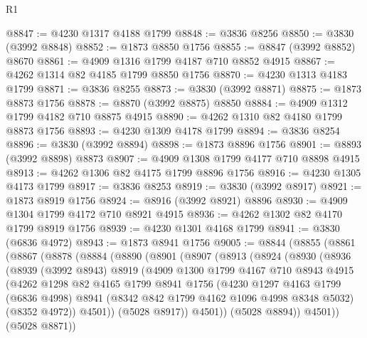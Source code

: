 \begin{lexlean}{R1}
\begin{coremodule}
@8847 := @4230 @1317 @4188 @1799
@8848 := @3836 @8256
@8850 := @3830 (@3992 @8848)
@8852 := @1873 @8850 @1756
@8855 := @8847 (@3992 @8852) @8670
@8861 := @4909 @1316 @1799 @4187 @710 @8852 @4915
@8867 := @4262 @1314 @82 @4185 @1799 @8850 @1756
@8870 := @4230 @1313 @4183 @1799
@8871 := @3836 @8255
@8873 := @3830 (@3992 @8871)
@8875 := @1873 @8873 @1756
@8878 := @8870 (@3992 @8875) @8850
@8884 := @4909 @1312 @1799 @4182 @710 @8875 @4915
@8890 := @4262 @1310 @82 @4180 @1799 @8873 @1756
@8893 := @4230 @1309 @4178 @1799
@8894 := @3836 @8254
@8896 := @3830 (@3992 @8894)
@8898 := @1873 @8896 @1756
@8901 := @8893 (@3992 @8898) @8873
@8907 := @4909 @1308 @1799 @4177 @710 @8898 @4915
@8913 := @4262 @1306 @82 @4175 @1799 @8896 @1756
@8916 := @4230 @1305 @4173 @1799
@8917 := @3836 @8253
@8919 := @3830 (@3992 @8917)
@8921 := @1873 @8919 @1756
@8924 := @8916 (@3992 @8921) @8896
@8930 := @4909 @1304 @1799 @4172 @710 @8921 @4915
@8936 := @4262 @1302 @82 @4170 @1799 @8919 @1756
@8939 := @4230 @1301 @4168 @1799
@8941 := @3830 (@6836 @4972)
@8943 := @1873 @8941 @1756
@9005 := @8844
    (@8855
      (@8861
        (@8867
          (@8878
            (@8884
              (@8890
                (@8901
                  (@8907
                    (@8913
                      (@8924
                        (@8930
                          (@8936
                            (@8939
                              (@3992 @8943)
                              @8919
                              (@4909
                                @1300
                                @1799
                                @4167
                                @710
                                @8943
                                @4915
                                (@4262
                                  @1298
                                  @82
                                  @4165
                                  @1799
                                  @8941
                                  @1756
                                  (@4230
                                    @1297
                                    @4163
                                    @1799
                                    (@6836 @4998)
                                    @8941
                                    (@8342 @842 @1799 @4162 @1096 @4998 @8348 @5032)
                                    (@8352 @4972))
                                  @4501))
                              (@5028 @8917))
                            @4501))
                        (@5028 @8894))
                      @4501))
                  (@5028 @8871))

\end{coremodule}
\end{lexlean}
